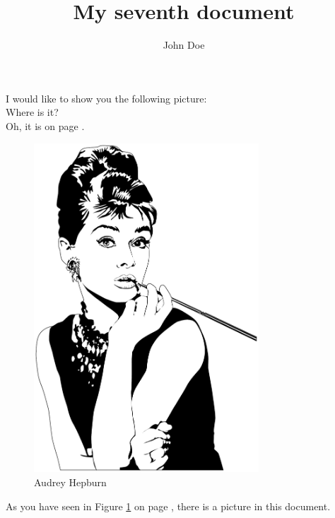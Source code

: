 \documentclass{article}
\title{My seventh document}
\author{John Doe}
\begin{document}
   \maketitle
   I would like to show you the following picture: \\
   
   Where is it?   \\
   
   Oh, it is on page \pageref{fig:hepburn}. \\
   
   \begin{figure}
   \center
   \includegraphics[width = 0.75\textwidth]{AudreyHepburn}
   \caption{Audrey Hepburn}
   \label{fig:hepburn}
   \end{figure}
   
   As you have seen in Figure \ref{fig:hepburn} on page \pageref{fig:hepburn}, there is a picture in this document.   
   
\end{document}
